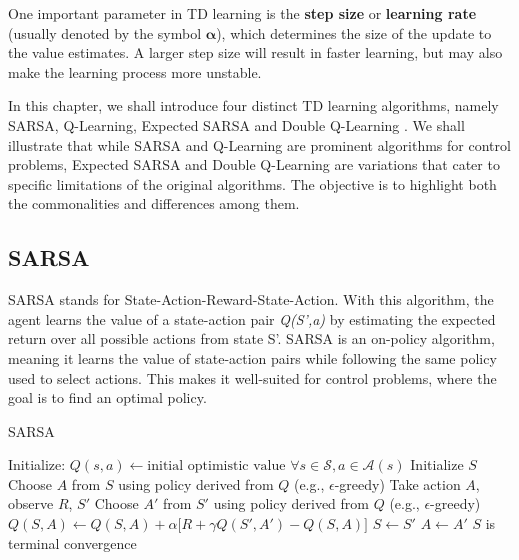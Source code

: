One important parameter in TD learning is the \textbf{step size} or \textbf{learning rate} (usually denoted by the symbol $\bm{\alpha}$), which determines the size of the update to the value estimates. A larger step size will result in faster learning, but may also make the learning process more unstable.

In this chapter, we shall introduce four distinct TD learning algorithms, namely SARSA, Q-Learning, Expected SARSA and Double Q-Learning  \citep{RLSuttonBarto}. We shall illustrate that while SARSA and Q-Learning are prominent algorithms for control problems, Expected SARSA and Double Q-Learning are variations that cater to specific limitations of the original algorithms. The objective is to highlight both the commonalities and differences among them.

\subsection{SARSA}
SARSA stands for State-Action-Reward-State-Action. With this algorithm, the agent learns the value of a state-action pair \textit{Q(S',a)} by estimating the expected return over all possible actions from state S'. SARSA is an on-policy algorithm, meaning it learns the value of state-action pairs while following the same policy used to select actions. This makes it well-suited for control problems, where the goal is to find an optimal policy.
\begin{algorithm}
\caption{SARSA}\label{algo:S}
\begin{algorithmic}[1]
\State Initialize:
\State \hspace{0.5cm} $Q(s,a) \gets \text{initial optimistic value } \forall s\in \mathcal{S}, a\in \mathcal{A}(s)$
\Repeat
\State Initialize $S$
\State Choose $A$ from $S$ using policy derived from $Q$ (e.g., $\epsilon$-greedy)
\Repeat
\State Take action $A$, observe $R$, $S'$
\State Choose $A'$ from $S'$ using policy derived from $Q$ (e.g., $\epsilon$-greedy)
\State $Q(S,A) \gets Q(S,A) + \alpha \big[ R + \gamma Q(S',A') - Q(S,A) \big]$
\State $S \gets S'$
\State $A \gets A'$
\Until $S$ is terminal
\Until convergence
\end{algorithmic}
\end{algorithm}

